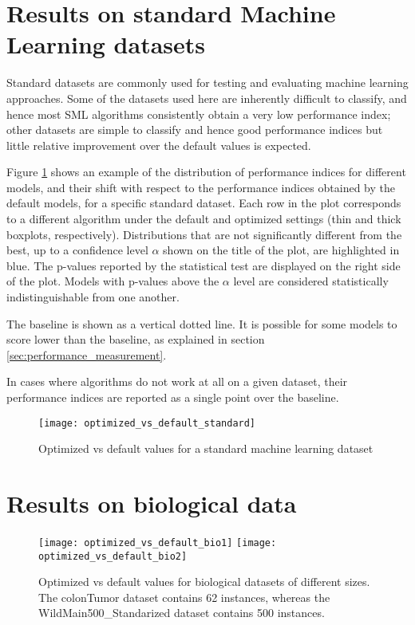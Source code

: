 \section{Results on standard Machine Learning datasets}

Standard datasets are commonly used for testing and evaluating machine learning approaches. Some of
the datasets used here are inherently difficult to classify, and hence most SML algorithms
consistently obtain a very low performance index; other datasets are simple to classify and hence
good performance indices but little relative improvement over the default values is expected.

Figure \ref{img:optvsdefstandard} shows an example of the distribution of performance indices for
different models, and their shift with respect to the performance indices obtained by the default
models, for a specific standard dataset. Each row in the plot corresponds to a different algorithm
under the default and optimized settings (thin and thick boxplots, respectively). Distributions that
are not significantly different from the best, up to a confidence level $\alpha$ shown on the title of the
plot, are highlighted in blue. The p-values reported by the statistical test are displayed on the right side
of the plot. Models with p-values above the $\alpha$ level are considered statistically
indistinguishable from one another.

The baseline is shown as a vertical dotted line. It is possible for some models to score lower than the
baseline, as explained in section \ref{sec:performance_measurement}.

In cases where algorithms do not work at all on a given dataset, their performance indices are
reported as a single point over the baseline.

\begin{figure}[t!]
	\centering
	\texttt{[image: optimized\_vs\_default\_standard]}
	\caption{Optimized vs default values for a standard machine learning dataset}
	\label{img:optvsdefstandard}
\end{figure}


\section{Results on biological data}

\begin{figure}[h!]
	\centering
	\texttt{[image: optimized\_vs\_default\_bio1]}
	\texttt{[image: optimized\_vs\_default\_bio2]}
	\caption[Optimized vs default values for biological datasets of different sizes]{Optimized vs
	default values for biological datasets of different sizes. The colonTumor dataset contains 62
	instances, whereas the WildMain500\_Standarized dataset contains 500 instances.}
	\label{img:optvsdefbio}
\end{figure}

